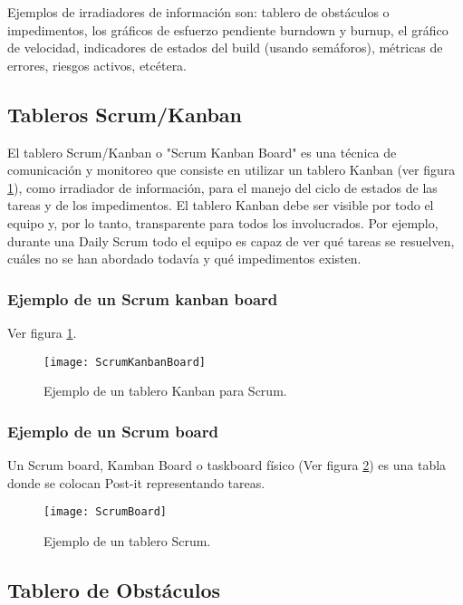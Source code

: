 Ejemplos de irradiadores de información son: tablero de obstáculos o impedimentos, los gráficos de esfuerzo pendiente burndown y burnup, el gráfico de velocidad, indicadores de estados del build (usando semáforos), métricas de errores, riesgos activos, etcétera.

\subsection{Tableros Scrum/Kanban}

El tablero Scrum/Kanban o "Scrum Kanban Board" es una técnica de comunicación y monitoreo que consiste en utilizar un tablero Kanban (ver figura \ref{fig:ScrumKanbanBoard}), como irradiador de información, para el manejo del ciclo de estados de las tareas y de los impedimentos. El tablero Kanban debe ser visible por todo el equipo y, por lo tanto, transparente para todos los involucrados. Por ejemplo, durante una Daily Scrum todo el equipo es capaz de ver qué tareas se resuelven, cuáles no se han abordado todavía y qué impedimentos existen.

\subsubsection{Ejemplo de un Scrum kanban board}

Ver figura \ref{fig:ScrumKanbanBoard}.

\begin{figure}[h]
  \centering
  \texttt{[image: ScrumKanbanBoard]}
  \caption{Ejemplo de un tablero Kanban para Scrum.}
  \centering
  \label{fig:ScrumKanbanBoard} %
\end{figure}

\subsubsection{Ejemplo de un Scrum board}

Un Scrum board, Kamban Board o taskboard físico (Ver figura \ref{fig:ScrumBoard}) es una tabla donde se colocan Post-it representando tareas.

\begin{figure}[h]
  \centering
  \texttt{[image: ScrumBoard]}
  \caption{Ejemplo de un tablero Scrum.}
  \centering
  \label{fig:ScrumBoard} %
\end{figure}

\subsection{Tablero de Obstáculos}

